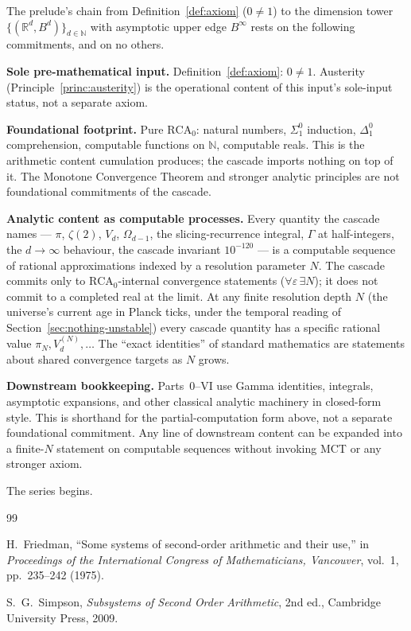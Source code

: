 \documentclass[11pt,a4paper]{article}
\begin{document}
The prelude's chain from Definition~\ref{def:axiom} ($0\neq 1$) to
the dimension tower $\{(\mathbb{R}^d, B^d)\}_{d\in\mathbb{N}}$ with
asymptotic upper edge $B^\infty$ rests on the following commitments,
and on no others.

\textbf{Sole pre-mathematical input.} Definition~\ref{def:axiom}:
$0 \neq 1$. Austerity (Principle~\ref{princ:austerity}) is the
operational content of this input's sole-input status, not a
separate axiom.

\textbf{Foundational footprint.} Pure $\mathrm{RCA}_0$: natural
numbers, $\Sigma^0_1$ induction, $\Delta^0_1$ comprehension,
computable functions on $\mathbb{N}$, computable reals. This is the
arithmetic content cumulation produces; the cascade imports nothing
on top of it. The Monotone Convergence Theorem and stronger analytic
principles are not foundational commitments of the cascade.

\textbf{Analytic content as computable processes.} Every quantity
the cascade names --- $\pi$, $\zeta(2)$, $V_d$, $\Omega_{d-1}$, the
slicing-recurrence integral, $\Gamma$ at half-integers, the
$d\to\infty$ behaviour, the cascade invariant $10^{-120}$ --- is a
computable sequence of rational approximations indexed by a
resolution parameter $N$. The cascade commits only to
$\mathrm{RCA}_0$-internal convergence statements ($\forall\varepsilon
\,\exists N$); it does not commit to a completed real at the limit.
At any finite resolution depth $N$ (the universe's current age in
Planck ticks, under the temporal reading of
Section~\ref{sec:nothing-unstable}) every cascade quantity has a
specific rational value $\pi_N, V_d^{(N)}, \ldots$ The ``exact
identities'' of standard mathematics are statements about shared
convergence targets as $N$ grows.

\textbf{Downstream bookkeeping.} Parts~0--VI use Gamma identities,
integrals, asymptotic expansions, and other classical analytic
machinery in closed-form style. This is shorthand for the
partial-computation form above, not a separate foundational
commitment. Any line of downstream content can be expanded into a
finite-$N$ statement on computable sequences without invoking MCT or
any stronger axiom.

\bigskip

The series begins.

\begin{thebibliography}{99}

 H.~Friedman, ``Some systems of second-order
arithmetic and their use,'' in \textit{Proceedings of the International
Congress of Mathematicians, Vancouver}, vol.~1, pp.~235--242 (1975).

 S.~G.~Simpson, \textit{Subsystems of Second
Order Arithmetic}, 2nd ed., Cambridge University Press, 2009.

\end{thebibliography}
\end{document}
